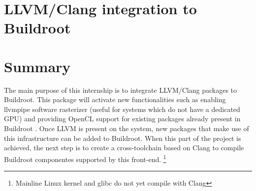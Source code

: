 \documentclass[12pt,a4paper,oneside]{article}
\begin{document}
\newpage
\section{LLVM/Clang integration to Buildroot}

\section*{Summary}
The main purpose of this internship is to integrate LLVM/Clang packages to Buildroot.
This package will activate new functionalities such as enabling llvmpipe software
rasterizer (useful for systems which do not have a dedicated GPU) and providing OpenCL
support for existing packages already present in Buildroot . Once LLVM is present
on the system, new packages that make use of this infrastructure can be added to
Buildroot. When this part of the project is achieved, the next step is to create
a cross-toolchain based on Clang to compile Buildroot componentes supported by
this front-end. \footnote{Mainline Linux kernel and glibc do not yet compile with
Clang}
\end{document}
